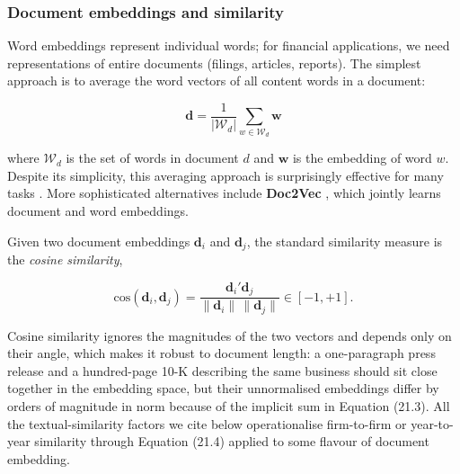 \subsubsection{Document embeddings and similarity}

Word embeddings represent individual words; for financial applications, we need representations of entire documents (filings, articles, reports). The simplest approach is to average the word vectors of all content words in a document:

\begin{equation}
\mathbf{d} = \frac{1}{|\mathcal{W}_d|} \sum_{w \in \mathcal{W}_d} \mathbf{w}
\tag{21.3}
\end{equation}

where $\mathcal{W}_d$ is the set of words in document $d$ and $\mathbf{w}$ is the embedding of word $w$. Despite its simplicity, this averaging approach is surprisingly effective for many tasks \citep{wieting2016towards}. More sophisticated alternatives include \textbf{Doc2Vec} \citep{lemikolov2014distributed}, which jointly learns document and word embeddings.

Given two document embeddings $\mathbf{d}_i$ and $\mathbf{d}_j$, the standard similarity measure is the \textit{cosine similarity},

\begin{equation}
\text{cos}(\mathbf{d}_i, \mathbf{d}_j) = \frac{\mathbf{d}_i' \mathbf{d}_j}{\|\mathbf{d}_i\|\, \|\mathbf{d}_j\|} \in [-1, +1].
\tag{21.4}
\end{equation}

Cosine similarity ignores the magnitudes of the two vectors and depends only on their angle, which makes it robust to document length: a one-paragraph press release and a hundred-page 10-K describing the same business should sit close together in the embedding space, but their unnormalised embeddings differ by orders of magnitude in norm because of the implicit sum in Equation (21.3). All the textual-similarity factors we cite below \citep{hoberg2016text, cohen2020lazy, cong2019textual} operationalise firm-to-firm or year-to-year similarity through Equation (21.4) applied to some flavour of document embedding.

